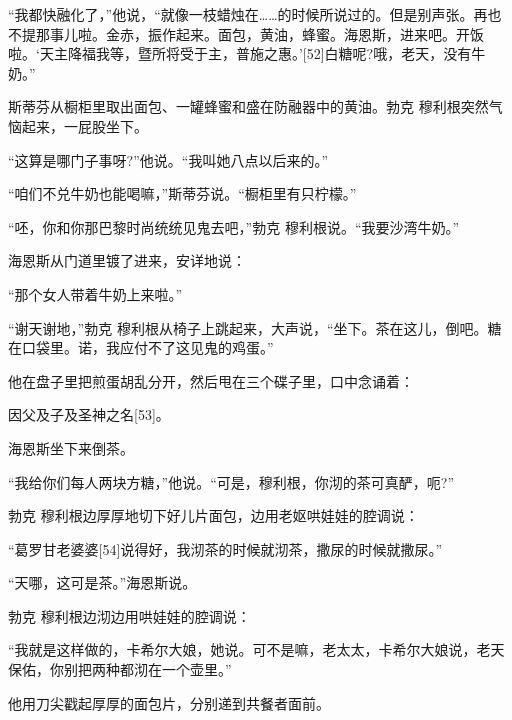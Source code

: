\documentclass{article}
\begin{document}
“我都快融化了，”他说，“就像一枝蜡烛在……的时候所说过的。但是别声张。再也不提那事儿啦。金赤，振作起来。面包，黄油，蜂蜜。海恩斯，进来吧。开饭啦。‘天主降福我等，暨所将受于主，普施之惠。’[52]白糖呢?哦，老天，没有牛奶。”



斯蒂芬从橱柜里取出面包、一罐蜂蜜和盛在防融器中的黄油。勃克 \cdot 穆利根突然气恼起来，一屁股坐下。



“这算是哪门子事呀?”他说。“我叫她八点以后来的。”



“咱们不兑牛奶也能喝嘛，”斯蒂芬说。“橱柜里有只柠檬。”



“呸，你和你那巴黎时尚统统见鬼去吧，”勃克 \cdot 穆利根说。“我要沙湾牛奶。”



海恩斯从门道里镀了进来，安详地说：



“那个女人带着牛奶上来啦。”



“谢天谢地，”勃克 \cdot 穆利根从椅子上跳起来，大声说，“坐下。茶在这儿，倒吧。糖在口袋里。诺，我应付不了这见鬼的鸡蛋。”



他在盘子里把煎蛋胡乱分开，然后甩在三个碟子里，口中念诵着：



因父及子及圣神之名[53]。



海恩斯坐下来倒茶。



“我给你们每人两块方糖，”他说。“可是，穆利根，你沏的茶可真酽，呃?”



勃克 \cdot 穆利根边厚厚地切下好儿片面包，边用老妪哄娃娃的腔调说：



“葛罗甘老婆婆[54]说得好，我沏茶的时候就沏茶，撒尿的时候就撒尿。”



“天哪，这可是茶。”海恩斯说。



勃克 \cdot 穆利根边沏边用哄娃娃的腔调说：



“我就是这样做的，卡希尔大娘，她说。可不是嘛，老太太，卡希尔大娘说，老天保佑，你别把两种都沏在一个壶里。”



他用刀尖戳起厚厚的面包片，分别递到共餐者面前。
\end{document}
